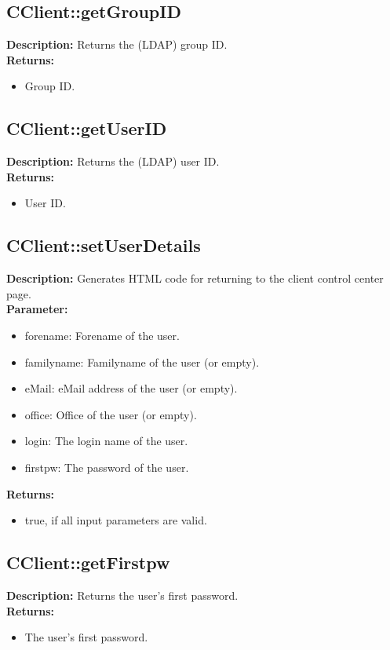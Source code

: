 \subsection{CClient::getGroupID}
\textbf{Description:} Returns the (LDAP) group ID.\\
\textbf{Returns:}
\begin{itemize}
\item Group ID.
\end{itemize}

\subsection{CClient::getUserID}
\textbf{Description:} Returns the (LDAP) user ID.\\
\textbf{Returns:}
\begin{itemize}
\item User ID.
\end{itemize}

\subsection{CClient::setUserDetails}
\textbf{Description:} Generates HTML code for returning to the client control center page.\\
\textbf{Parameter:}
\begin{itemize}
\item forename: Forename of the user.
\item familyname: Familyname of the user (or empty).
\item eMail: eMail address of the user (or empty).
\item office: Office of the user (or empty).
\item login: The login name of the user.
\item firstpw: The password of the user.
\end{itemize}
\textbf{Returns:}
\begin{itemize}
\item true, if all input parameters are valid.
\end{itemize}

\subsection{CClient::getFirstpw}
\textbf{Description:} Returns the user's first password.\\
\textbf{Returns:}
\begin{itemize}
\item The user's first password.
\end{itemize}

